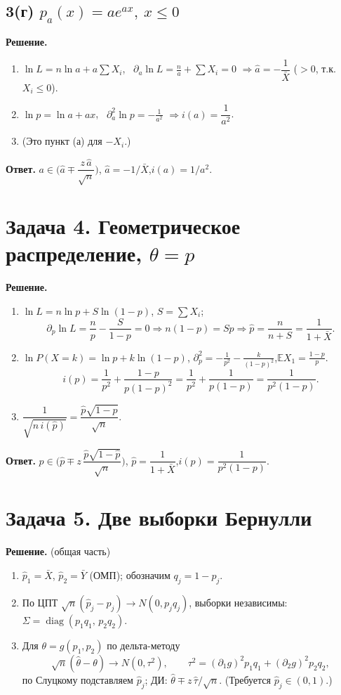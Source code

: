 \documentclass[12pt,a4paper]{article}
\newcommand{\E}{\mathbb{E}}
\newcommand{\sol}{\par\noindent\textbf{Решение.} }
\newcommand{\ans}{\par\smallskip\noindent\textbf{Ответ.} }
\begin{document}
\subsection*{3(г) \quad $p_a(x)=ae^{ax},\ x\le0$}
\sol
\begin{enumerate}
  \item $\ln L=n\ln a+a\sum X_i$, \ $\partial_a\ln L=\frac na+\sum X_i=0$
        $\Rightarrow\hat a=-\dfrac1{\bar X}$ ($>0$, т.к. $X_i\le0$).
  \item $\ln p=\ln a+ax$, \ $\partial_a^2\ln p=-\frac1{a^2}$
        $\Rightarrow i(a)=\dfrac1{a^2}$.
  \item (Это пункт (а) для $-X_i$.)
\end{enumerate}
\ans $a\in\Big(\hat a\mp\dfrac{z\,\hat a}{\sqrt n}\Big)$,\quad
     $\hat a=-1/\bar X$,\quad $i(a)=1/a^2$.

\section*{Задача 4. Геометрическое распределение, $\theta=p$}
\sol
\begin{enumerate}
  \item $\ln L=n\ln p+S\ln(1-p)$, $S=\sum X_i$;
  \[
    \partial_p\ln L=\frac np-\frac S{1-p}=0\Rightarrow n(1-p)=Sp
    \Rightarrow\hat p=\frac{n}{n+S}=\frac1{1+\bar X}.
  \]
  \item $\ln P(X=k)=\ln p+k\ln(1-p)$,\quad
        $\partial_p^2=-\frac1{p^2}-\frac k{(1-p)^2}$,\quad $\E X_1=\frac{1-p}p$.
  \[
    i(p)=\frac1{p^2}+\frac{1-p}{p(1-p)^2}=\frac1{p^2}+\frac1{p(1-p)}
    =\frac{1}{p^2(1-p)}.
  \]
  \item $\dfrac1{\sqrt{n\,i(\hat p)}}=\dfrac{\hat p\sqrt{1-\hat p}}{\sqrt n}$.
\end{enumerate}
\ans $p\in\Big(\hat p\mp z\,\dfrac{\hat p\sqrt{1-\hat p}}{\sqrt n}\Big)$,\quad
     $\hat p=\dfrac1{1+\bar X}$,\quad $i(p)=\dfrac1{p^2(1-p)}$.

\section*{Задача 5. Две выборки Бернулли}
\sol (общая часть)
\begin{enumerate}
  \item $\hat p_1=\bar X$, $\hat p_2=\bar Y$ (ОМП); обозначим $q_j=1-p_j$.
  \item По ЦПТ $\sqrt n(\hat p_j-p_j)\to N(0,p_jq_j)$, выборки независимы:
        $\Sigma=\operatorname{diag}(p_1q_1,\,p_2q_2)$.
  \item Для $\theta=g(p_1,p_2)$ по дельта-методу
  \[
    \sqrt n(\hat\theta-\theta)\to N(0,\tau^2),\qquad
    \tau^2=(\partial_1g)^2p_1q_1+(\partial_2g)^2p_2q_2,
  \]
  по Слуцкому подставляем $\hat p_j$; ДИ: $\hat\theta\mp z\,\hat\tau/\sqrt n$.
  (Требуется $\hat p_j\in(0,1)$.)
\end{enumerate}
\end{document}
